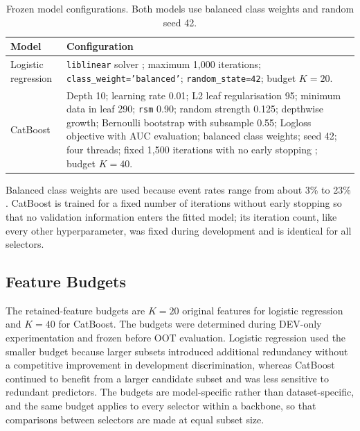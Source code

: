 \documentclass[preprint,12pt]{elsarticle}
\newcommand{\Kfeat}{K}
\begin{document}
\begin{table}[htbp]
\centering
\small
\begin{threeparttable}
\caption{Frozen model configurations. Both models use balanced class weights and random seed 42.}
\label{tab:models}
\begin{tabular}{@{}lL{90mm}@{}}
\toprule
Model & Configuration \\
\midrule
Logistic regression & \texttt{liblinear} solver \cite{fan2008,pedregosa2011}; maximum 1,000 iterations; \texttt{class\_weight='balanced'}; \texttt{random\_state=42}; budget $\Kfeat=20$. \\
CatBoost & Depth 10; learning rate 0.01; L2 leaf regularisation 95; minimum data in leaf 290; \texttt{rsm} 0.90; random strength 0.125; depthwise growth; Bernoulli bootstrap with subsample 0.55; Logloss objective with AUC evaluation; balanced class weights; seed 42; four threads; fixed 1,500 iterations with no early stopping \cite{prokhorenkova2018}; budget $\Kfeat=40$. \\
\bottomrule
\end{tabular}
\end{threeparttable}
\end{table}

Balanced class weights are used because event rates range from about 3\% to 23\% \cite{he2009}. CatBoost is trained for a fixed number of iterations without early stopping so that no validation information enters the fitted model; its iteration count, like every other hyperparameter, was fixed during development and is identical for all selectors.

\subsection{Feature Budgets}
\label{subsec:feature_budgets}

The retained-feature budgets are $\Kfeat=20$ original features for logistic regression and $\Kfeat=40$ for CatBoost. The budgets were determined during DEV-only experimentation and frozen before OOT evaluation. Logistic regression used the smaller budget because larger subsets introduced additional redundancy without a competitive improvement in development discrimination, whereas CatBoost continued to benefit from a larger candidate subset and was less sensitive to redundant predictors. The budgets are model-specific rather than dataset-specific, and the same budget applies to every selector within a backbone, so that comparisons between selectors are made at equal subset size.
\end{document}
